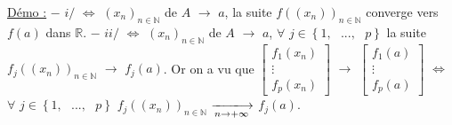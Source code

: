 \documentclass{article}
\begin{document}
\parindent=0cm
\smallbreak
\underline{Démo :} \parindent=1cm \smallbreak
$-$ $i/$ $\Longleftrightarrow$ 
$(x_n)_{n \in \mathbb{N}}$ de $A$ $\longrightarrow$ $a$, la suite $f((x_n))_{n \in \mathbb{N}}$ converge vers $f(a)$ dans $\mathbb{R}$.
\smallbreak
$-$ $ii/$ $\Longleftrightarrow$ 
$(x_n)_{n \in \mathbb{N}}$ de $A$ $\longrightarrow$ $a$, $\forall$ $j \in \left\{ 1,\text{ }...,\text{ }p \right\} $ la suite $f_j((x_n))_{n \in \mathbb{N}}$ $\longrightarrow$ $f_j(a)$.
\smallbreak
Or on a vu que $
\begin{bmatrix}
	f_1(x_n) \\
	\vdots \\
	f_p(x_n)
\end{bmatrix}
$ $\longrightarrow$ 
$
\begin{bmatrix}
	f_1(a) \\
	\vdots \\
	f_p(a)
\end{bmatrix}
$
$\Longleftrightarrow$ $\forall$ $j \in \left\{ 1,\text{ }...,\text{ }p \right\}$ $f_j((x_n))_{n \in \mathbb{N}}$ $\tendplusinf$ $f_j(a)$.
\end{document}
